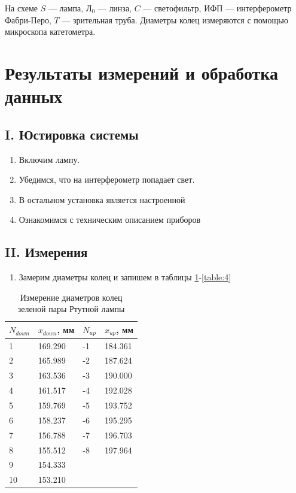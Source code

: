 \documentclass[a4paper,12pt]{article}
\begin{document}
На схеме $S$ --- лампа, $ Л_0 $ --- линза, $ C $ --- светофильтр, ИФП --- интерферометр
Фабри-Перо, $T$ --- зрительная труба. Диаметры колец измеряются с помощью микроскопа
катетометра.

\section{Результаты измерений и обработка данных}

\subsection*{I. Юстировка системы}

\begin{enumerate}
    \item Включим лампу.
    \item Убедимся, что на интерферометр попадает свет.
    \item В остальном установка является настроенной
    \item Ознакомимся с техническим описанием приборов
\end{enumerate}

\subsection*{II. Измерения}

\begin{enumerate}[resume]
    \item Замерим диаметры колец и запишем в таблицы \ref{table:1}-\ref{table:4}
\end{enumerate}

\FloatBarrier
\begin{table}[!ht]
    \centering
    \caption{Измерение диаметров колец зеленой пары Ртутной лампы}
    \begin{tabular}{|l|l|l|l|}
        \hline
        $N_{down}$ & $x_{down}$, мм & $N_{up}$ & $x_{up}$, мм   \\ \hline
        1       & 169.290 & -1    & 184.361 \\ \hline
        2       & 165.989 & -2    & 187.624 \\ \hline
        3       & 163.536 & -3    & 190.000 \\ \hline
        4       & 161.517 & -4    & 192.028 \\ \hline
        5       & 159.769 & -5    & 193.752 \\ \hline
        6       & 158.237 & -6    & 195.295 \\ \hline
        7       & 156.788 & -7    & 196.703 \\ \hline
        8       & 155.512 & -8    & 197.964 \\ \hline
        9       & 154.333 &       &         \\ \hline
        10      & 153.210 &       &         \\ \hline
    \end{tabular}
    \label{table:1}
\end{table}
\FloatBarrier
\end{document}
